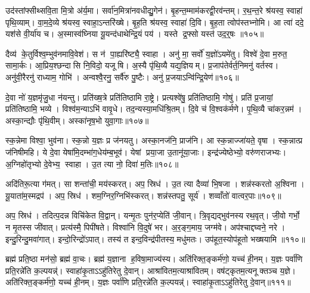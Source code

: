 उद॑स्तांफ्सीथ्सवि॒ता मि॒त्रो अ॑र्य॒मा। सर्वा॑न॒मित्रा॑नवधीद्यु॒गेन॑। बृ॒हन्त॒म्माम॑करद्वी॒रव॑न्तम्। र॒थ॒न्त॒रे श्र॑यस्व॒ स्वाहा॑ पृथि॒व्याम्। वा॒म॒दे॒व्ये श्र॑यस्व॒ स्वाहा॒ऽन्तरि॑ख्षे। बृ॒ह॒ति श्र॑यस्व॒ स्वाहा॑ दि॒वि। बृ॒ह॒ता त्वोप॑स्तभ्नोमि। आ त्वा॑ ददे॒ यश॑से वी॒र्या॑य च। अ॒स्मास्व॑घ्निया यू॒यन्द॑धाथेन्द्रि॒यं पय॑। यस्ते द्र॒फ्सो यस्त॑ उद॒र्॒षः ॥१०५॥

दैव्य॑ के॒तुर्विश्व॒म्भुव॑नमावि॒वेश॑। स न॑ पा॒ह्यरि॑ष्ट्यै॒ स्वाहा। अनु॑ मा॒ सर्वो॑ य॒ज्ञो॑ऽयमे॑तु। विश्वे॑ दे॒वा म॒रुत॒ सामा॒र्कः। आ॒प्रिय॒श्छन्दासि नि॒विदो॒ यजूषि। अ॒स्यै पृ॑थि॒व्यै यद्य॒ज्ञियम्। प्र॒जाप॑तेर्वर्त॒निमनु॑ वर्तस्व। अनु॑वी॒रैरनु॑ राध्याम॒ गोभि॑। अन्वश्वै॒रनु॒ सर्वै॑रु पु॒ष्टैः। अनु॑ प्र॒जयाऽन्वि॑न्द्रि॒येण॑॥१०६॥

दे॒वा नो॑ य॒ज्ञमृ॑जु॒धा न॑यन्तु। प्रति॑ख्ष॒त्रे प्रति॑तिष्ठामि रा॒ष्ट्रे। प्रत्यश्वे॑षु॒ प्रति॑तिष्ठामि॒ गोषु॑। प्रति॑ प्र॒जायां॒ प्रति॑तिष्ठामि॒ भव्ये। विश्व॑म॒न्याऽभि॑ वावृ॒धे। तद॒न्यस्या॒मधि॑श्रि॒तम्। दि॒वे च॑ वि॒श्वक॑र्मणे। पृ॒थि॒व्यै चा॑कर॒न्नम॑। अस्का॒न्द्यौः पृ॑थि॒वीम्। अस्का॑नृष॒भो युवा॒गाः॥१०७॥

स्क॒न्नेमा विश्वा॒ भुव॑ना। स्क॒न्नो य॒ज्ञः प्र ज॑नयतु। अस्का॒नज॑नि॒ प्राज॑नि। आ स्क॒न्नाज्जा॑यते॒ वृषा। स्क॒न्नात्प्र ज॑निषीमहि। ये दे॒वा येषा॑मि॒दम्भा॑ग॒धेय॑म्ब॒भूव॑। येषां प्रया॒जा उ॒तानू॑या॒जाः। इन्द्र॑ज्येष्ठेभ्यो॒ वरु॑णराजभ्यः। अ॒ग्निहो॑तृभ्यो दे॒वेभ्य॒ स्वाहा। उ॒त त्या नो॒ दिवा॑ म॒तिः॥१०८॥

अदि॑तिरू॒त्या ग॑मत्। सा शन्ता॑ची॒ मय॑स्करत्। अप॒ स्रिध॑। उ॒त त्या दैव्या॑ भि॒षजा। शन्न॑स्करतो अ॒श्विना। यू॒याता॑म॒स्मद्रप॑। अप॒ स्रिध॑। शम॒ग्निर॒ग्निभि॑स्करत्। शन्न॑स्तपतु॒ सूर्य॑। शव्वाँतो॑ वात्वर॒पाः॥१०९॥

अप॒ स्रिध॑। तदित्प॒दन्न विचि॑केत वि॒द्वान्। यन्मृ॒तः पुन॑र॒प्येति॑ जी॒वान्। त्रि॒वृद्यद्भुव॑नस्य रथ॒वृत्। जी॒वो गर्भो॒ न मृ॒तस्स जी॑वात्। प्रत्य॑स्मै॒ पिपी॑षते। विश्वा॑नि वि॒दुषे॑ भर। अ॒र॒ङ्ग॒माय॒ जग्म॑वे। अप॑श्चाद्दघ्वने॒ नरे। इन्दु॒रिन्दु॒मवा॑गात्। इन्दो॒रिन्द्रो॑ऽपात्। तस्य॑ त इन्द॒विन्द्र॑पीतस्य॒ मधु॑मतः। उप॑हूत॒स्योप॑हूतो भख्षयामि ॥११०॥\anuvakamend[उ॒द॒र्॒ष इ॑न्द्रि॒येण॒ गा म॒तिर॑र॒पा अ॑गा॒त्रीणि॑ च]

ब्रह्म॑ प्रति॒ष्ठा मन॑सो॒ ब्रह्म॑ वा॒चः। ब्रह्म॑ य॒ज्ञाना ह॒विषा॒माज्य॑स्य। अति॑रिक्त॒ङ्कर्म॑णो॒ यच्च॑ ही॒नम्। य॒ज्ञः पर्वा॑णि प्रति॒रन्ने॑ति क॒ल्पयन्न्॑। स्वाहा॑कृ॒ताऽऽहु॑तिरेतु दे॒वान्। आश्रा॑वितम॒त्याश्रा॑वितम्। वष॑ट्कृतम॒त्यनूक्तञ्च य॒ज्ञे। अति॑रिक्त॒ङ्कर्म॑णो॒ यच्च॑ ही॒नम्। य॒ज्ञः पर्वा॑णि प्रति॒रन्ने॑ति क॒ल्पयन्न्॑। स्वाहा॑कृ॒ताऽऽहु॑तिरेतु दे॒वान्॥१११॥

